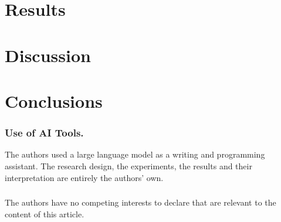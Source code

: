 \documentclass[runningheads]{llncs}
\newif\ifblind \blindtrue        %
\begin{document}
\section{Results}

\section{Discussion}

\section{Conclusions}

\begin{credits}
\ifblind\else
\subsubsection{Acknowledgements.} <…>
\fi
\subsubsection{Use of AI Tools.} The authors used a large language model as
a writing and programming assistant. The research design, the experiments,
the results and their interpretation are entirely the authors' own.

\subsubsection{\discintname} The authors have no competing interests to
declare that are relevant to the content of this article.
\end{credits}



\end{document}
